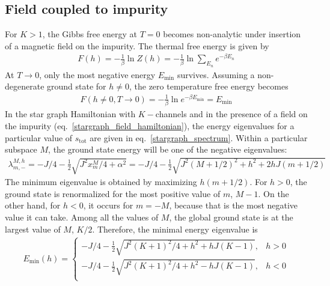 \documentclass[12pt]{revtex4-2}
\begin{document}
\subsection{Field coupled to impurity}
For \(K>1\), the Gibbs free energy at \(T=0\) becomes non-analytic under insertion of a magnetic field on the impurity. The thermal free energy is given by
\begin{equation}\begin{aligned}
	F(h) = -\frac{1}{\beta}\ln Z(h) = -\frac{1}{\beta}\ln\sum_{E_n}e^{-\beta E_n}
\end{aligned}\end{equation}
At \(T \to 0\), only the most negative energy \(E_\text{min}\) survives. Assuming a non-degenerate ground state for \(h \neq 0\), the zero temperature free energy becomes
\begin{equation}\begin{aligned}
	F(h\neq 0, T\to 0) = -\frac{1}{\beta}\ln e^{-\beta E_\text{min}} = E_\text{min}
\end{aligned}\end{equation}
In the star graph Hamiltonian with \(K-\)channels and in the presence of a field on the impurity (eq.~\ref{stargraph_field_hamiltonian}), the energy eigenvalues for a particular value of \(s_\text{tot}\) are given in eq.~\ref{stargraph_spectrum}. Within a particular subspace \(M\), the ground state energy will be one of the negative eigenvalues:
\begin{equation}\begin{aligned}
	\lambda^{M,h}_{m, -}= -J/4 - \frac{1}{2}\sqrt{J^2x^M_{m}/4 + \alpha^2} = -J/4 - \frac{1}{2}\sqrt{J^2(M+1/2)^2 + h^2 + 2hJ(m+1/2)}
\end{aligned}\end{equation}
The minimum eigenvalue is obtained by maximizing \(h(m+1/2)\). For \(h>0\), the ground state is renormalized for the most positive value of \(m\), \(M-1\). On the other hand, for \(h<0\), it occurs for \(m=-M\), because that is the most negative value it can take. Among all the values of \(M\), the global ground state is at the largest value of \(M\), \(K/2\). Therefore, the minimal energy eigenvalue is
\begin{equation}\begin{aligned}
	E_\text{min}(h) = \begin{cases}
		-J/4 - \frac{1}{2}\sqrt{J^2(K+1)^2/4 + h^2 + hJ(K-1)}, & h>0\\
		-J/4 - \frac{1}{2}\sqrt{J^2(K+1)^2/4 + h^2 - hJ(K-1)}, & h<0\\
	\end{cases}
\end{aligned}\end{equation}
\end{document}
